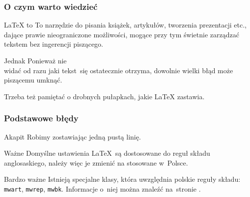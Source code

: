 \documentclass{beamer}  %
\begin{document}
\begin{frame}
  \frametitle{O czym warto wiedzieć}

  \begin{block}{\LaTeX{} to}
    To narzędzie do pisania książek, artykułów, tworzenia \linebreak
    prezentacji etc., dające prawie nieograniczone możliwości,
    \linebreak mogące przy tym świetnie zarządzać tekstem bez
    ingerencji piszącego.
  \end{block}

  \begin{block}{Jednak}
    Ponieważ nie \\
    widać od razu jaki tekst~się ostatecznie \linebreak otrzyma,
    dowolnie wielki błąd może piszącemu umknąć.
  \end{block}

  \begin{block}
    Trzeba też pamiętać o drobnych pułapkach, jakie \LaTeX{} zastawia.
  \end{block}

\end{frame}



\begin{frame}
  \frametitle{Podstawowe błędy}

  \begin{block}{Akapit}
    Robimy zostawiając jedną pustą linię.
  \end{block}

  \begin{block}{Ważne}
    Domyślne ustawienia \LaTeX{}~są dostosowane do reguł składu
    anglosaskiego, należy więc je zmienić na stosowane w~Polsce.
  \end{block}

  \begin{block}{Bardzo ważne}
    Istnieją specjalne klasy, która uwzględnia polskie reguły składu:
    \texttt{mwart}, \texttt{mwrep}, \texttt{mwbk}. Informacje o~niej
    można znaleźć na~stronie
    .
  \end{block}

\end{frame}
\end{document}
